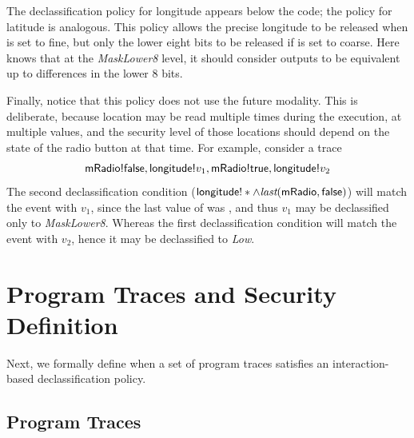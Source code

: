 The declassification policy for longitude appears below the code; the
policy for latitude is analogous.  This policy allows the precise
longitude to be released when
 is set to fine, but only the lower eight bits to
be released if  is set to coarse. Here \toolname{}
knows that at the \textit{MaskLower8} level, it should consider
outputs to be equivalent up to differences in the lower 8
bits. 

Finally, notice that this policy does not use the future
modality. This is deliberate, because location may be read multiple
times during the execution, at multiple values, and the security level
of those locations should depend on the state of the
radio button at that time. For example, consider a trace
\begin{displaymath}
  \textsf{mRadio!false}, \textsf{longitude!}v_1,
  \textsf{mRadio!true}, \textsf{longitude!}v_2
\end{displaymath}
The second declassification condition ($\textsf{longitude}!\ast \wedge
\textit{last}(\textsf{mRadio}, \textsf{false})$) will match the event with $v_1$, since
the last value of  was , and
thus $v_1$ may be declassified only to \textit{MaskLower8}. Whereas
the first declassification condition will match the event with $v_2$, hence it
may be declassified to \textit{Low}.

\section{Program Traces and Security Definition}
\label{sec:formalism}

Next, we formally define when a set of program traces satisfies an
interaction-based declassification policy.

\subsection{Program Traces}
\label{sec:traces}

